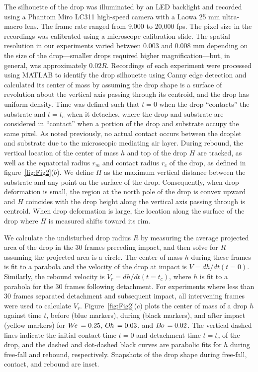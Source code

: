 \documentclass{jfm}
\newcommand{\We}{W\kern-0.15em e\,}
\newcommand{\Bo}{B\kern-0.05em o\,}
\newcommand{\Oh}{O\kern-0.05em h\,}
\begin{document}
The silhouette of the drop was illuminated by an LED backlight and recorded using a Phantom Miro LC311 high-speed camera with a Laowa 25 mm ultra-macro lens. The frame rate ranged from 9,000 to 20,000 fps. The pixel size in the recordings was calibrated using a microscope calibration slide. The spatial resolution in our experiments varied between 0.003 and 0.008 mm depending on the size of the drop---smaller drops required higher magnification---but, in general, was approximately $0.02 R$. Recordings of each experiment were processed using MATLAB to identify the drop silhouette using Canny edge detection and calculated its center of mass by assuming the drop shape is a surface of revolution about the vertical axis passing through its centroid, and the drop has uniform density. Time was defined such that $t = 0$ when the drop ``contacts'' the substrate and $t=t_{c}$ when it detaches, where the drop and substrate are considered in ``contact'' when a portion of the drop and substrate occupy the same pixel. As noted previously, no actual contact occurs between the droplet and substrate due to the microscopic mediating air layer. During rebound, the vertical location of the center of mass $h$ and top of the drop $H$ are tracked, as well as the equatorial radius $r_m$ and contact radius $r_c$ of the drop, as defined in figure~\ref{fig:Fig2}($b$). We define $H$ as the maximum vertical distance between the substrate and any point on the surface of the drop. Consequently, when drop deformation is small, the region at the north pole of the drop is convex upward and $H$ coincides with the drop height along the vertical axis passing through is centroid. When drop deformation is large, the location along the surface of the drop where $H$ is measured shifts toward its rim.

We calculate the undisturbed drop radius $R$ by measuring the average projected area of the drop in the 30 frames preceding impact, and then solve for $R$ assuming the projected area is a circle. The center of mass $h$ during these frames is fit to a parabola and the velocity of the drop at impact is $V = dh/dt(t=0)$. Similarly, the rebound velocity is $V_r=dh/dt(t=t_{c})$, where $h$ is fit to a parabola for the 30 frames following detachment. For experiments where less than 30 frames separated detachment and subsequent impact, all intervening frames were used to calculate $V_r$. Figure~\ref{fig:Fig2}($c$) plots the center of mass of a drop $h$ against time $t$, before (blue markers), during (black markers), and after impact (yellow markers) for $\We=0.25$, $\Oh=0.03$, and $\Bo=0.02$. The vertical dashed lines indicate the initial contact time $t=0$ and detachment time $t=t_c$ of the drop, and the dashed and dot-dashed black curves are parabolic fits for $h$ during free-fall and rebound, respectively. Snapshots of the drop shape during free-fall, contact, and rebound are inset.
\end{document}
